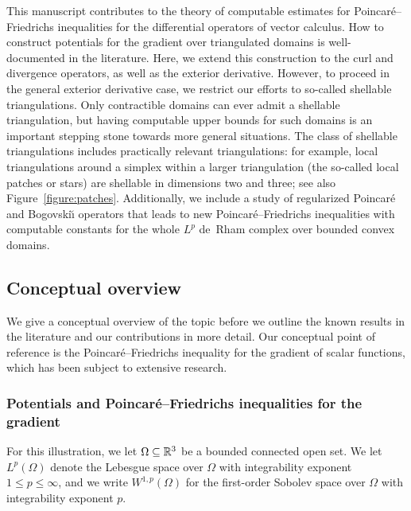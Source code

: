 \documentclass[10pt,a4paper]{article}
\begin{document}
This manuscript contributes to the theory of computable estimates for Poincar\'e--Friedrichs inequalities for the differential operators of vector calculus. 
How to construct potentials for the gradient over triangulated domains is well-documented in the literature. 
Here, we extend this construction to the curl and divergence operators, as well as the exterior derivative. 
However, to proceed in the general exterior derivative case, we restrict our efforts to so-called shellable triangulations. 
Only contractible domains can ever admit a shellable triangulation, but having computable upper bounds for such domains is an important stepping stone towards more general situations. 
The class of shellable triangulations includes practically relevant triangulations: 
for example, local triangulations around a simplex within a larger triangulation (the so-called local patches or stars) are shellable in dimensions two and three; see also Figure~\ref{figure:patches}. 
Additionally, we include a study of regularized Poincar\'e and Bogovski\u{\i} operators that leads to new Poincar\'e--Friedrichs inequalities with computable constants for the whole $L^{p}$ de~Rham complex over bounded convex domains.




\subsection{Conceptual overview}

We give a conceptual overview of the topic before we outline the known results in the literature and our contributions in more detail. 
Our conceptual point of reference is the Poincar\'e--Friedrichs inequality for the gradient of scalar functions, which has been subject to extensive research.


\subsubsection{Potentials and Poincar\'e--Friedrichs inequalities for the gradient}

For this illustration, we let $\Omega \subseteq {\mathbb R}^3$ be a bounded connected open set. 
We let $L^{p}(\Omega)$ denote the Lebesgue space over $\Omega$ with integrability exponent $1 \leq p \leq \infty$, 
and we write $W^{1,p}(\Omega)$ for the first-order Sobolev space over $\Omega$ with integrability exponent $p$. 
\end{document}
